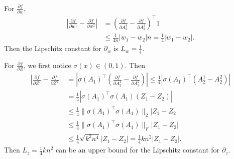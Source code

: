 \documentclass{article}
\newcommand{\ml}{\mathcal{L}}
\numberwithin{equation}{section}
\numberwithin{figure}{section}
\begin{document}
For $\frac{\partial f}{\partial w}$,
\begin{equation}
\begin{aligned}
\left|\frac{\partial f}{\partial w^1} - \frac{\partial f}{\partial w^2}\right| &= \left(\frac{\partial f}{\partial A_2^1} - \frac{\partial f}{\partial A_2^2}\right)^\top 1 \\
&\le \frac{1}{4n}|w_1 - w_2|n = \frac{1}{4}|w_1 - w_2|.
\end{aligned}
\end{equation}
Then the Lipschitz constant for $\partial_w $ is $L_w = \frac{1}{4} $.

For $\frac{\partial f}{\partial Z}$, we first notice $\sigma(x) \in (0, 1)$. Then 
\begin{equation}
\begin{aligned}
\left|\frac{\partial f}{\partial Z^1} - \frac{\partial f}{\partial Z^2}\right| &= \left| \sigma(A_1)^\top \left(\frac{\partial f}{\partial A_2^1}-\frac{\partial f}{\partial A_2^2}\right)\right|\le \frac{1}{4}\left| \sigma(A_1)^\top (A_2^1 - A_2^2)\right| \\
&= \frac{1}{4}|\sigma(A_1)^\top \sigma(A_1)(Z_1-Z_2)| \\
&\le \frac{1}{4}\lVert \sigma(A_1)^\top\sigma(A_1)\rVert_2 |Z_1-Z_2| \\
&\le \frac{1}{4}\lVert \sigma(A_1)^\top\sigma(A_1)\rVert_F |Z_1-Z_2| \\
&\le \frac{1}{4}\sqrt{k^2 n^4}|Z_1-Z_2| = \frac{1}{4}kn^2|Z_1-Z_2|.
\end{aligned}
\end{equation}
Then $L_z = \frac{1}{4}kn^2 $ can be an upper bound for the Lipschitz constant for $\partial_z $.

\end{document}
